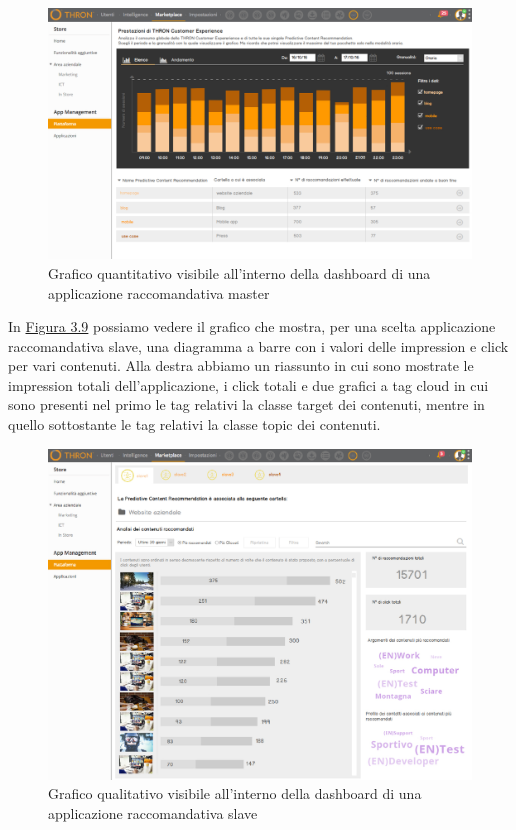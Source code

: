 \documentclass[a4paper, 12pt, twoside, openright]{book}
\begin{document}
\begin{figure}[H]
	\centering
	\label{grafico-quantitativo}
	\includegraphics[width=1.0\textwidth]{images/grafico-quantitativo.jpg}
	\caption{Grafico quantitativo visibile all'interno della dashboard di una applicazione raccomandativa master}
\end{figure}
In \hyperref[grafico-qualitativo-1]{Figura 3.9} possiamo vedere il grafico che mostra, per una scelta applicazione raccomandativa slave, una diagramma a barre con i valori delle impression e click per vari contenuti. Alla destra abbiamo un riassunto in cui sono mostrate le impression totali dell'applicazione, i click totali e due grafici a tag cloud in cui sono presenti nel primo le tag relativi la classe target dei contenuti, mentre in quello sottostante le tag relativi la classe topic dei contenuti. 
\begin{figure}[H]
	\centering
	\label{grafico-qualitativo-1}
	\includegraphics[width=1.0\textwidth]{images/grafico-qualitativo-1.jpg}
	\caption{Grafico qualitativo visibile all'interno della dashboard di una applicazione raccomandativa slave}
\end{figure}
\end{document}
